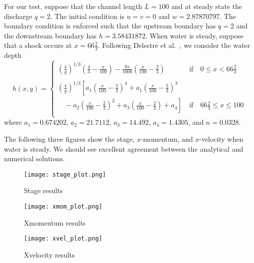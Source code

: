 For our test, suppose that the channel length $L = 100$ and at steady state the discharge $q = 2$. The initial condition is $u=v=0$ and $w=2.87870797$. The boundary condition is enforced such that the upstream boundary has $q=2$ and the downstream boundary has $h=3.58431872$. When water is steady, suppose that a shock occurs at $x=66\frac23$. Following Delestre et al.~\cite{Delestre-etal2012}, we consider the water depth
\begin{equation}
h(x,y)= \left\{ \begin{array}{ll}
       \left( \frac{4}{g}\right)^{1/3} 
       \left(\frac43 - \frac{x}{100}  \right) - \frac{9x}{1000} \left( \frac{x}{100} -\frac23 \right)
        & ~\textrm{if}\quad 0 \leq x < 66\frac23\\
        ~~ & ~~ \\
       \left( \frac{4}{g}\right)^{1/3}
       \left[ a_1\left( \frac{x}{100} -\frac23 \right)^4 +a_1\left(  \frac{x}{100} -\frac23 \right)^3 \right.\\
       \left. \quad -a_2 \left( \frac{x}{100} -\frac23 \right)^2 + a_3 \left( \frac{x}{100} -\frac23 \right) +a_4\right] 
       & ~\textrm{if}\quad 66\frac23 \leq x \leq 100\\
\end{array} \right.
\end{equation} 
where 
$a_1 = 0.674202$, 
$a_2 = 21.7112$, 
$a_3 = 14.492$, 
$a_4 = 1.4305$, and 
$n  = 0.0328$.


The following three figures show the stage, $x$-momentum, and $x$-velocity when water is steady. We should see excellent agreement between the analytical and numerical solutions.

\begin{figure}
\begin{center}
\texttt{[image: stage\_plot.png]}
\end{center}
\caption{Stage results}
\end{figure}


\begin{figure}
\begin{center}
\texttt{[image: xmom\_plot.png]}
\end{center}
\caption{Xmomentum results}
\end{figure}


\begin{figure}
\begin{center}
\texttt{[image: xvel\_plot.png]}
\end{center}
\caption{Xvelocity results}
\end{figure}


\endinput

